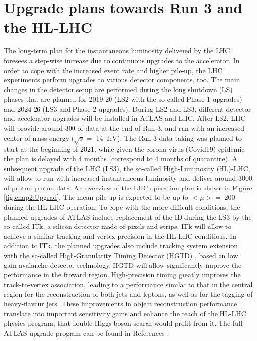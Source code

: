 \section{Upgrade plans towards Run 3 and the HL-LHC}
\label{chap2:Upgrad}
The long-term plan for the instantaneous luminosity delivered by the LHC foresees a step-wise increase due to continuous upgrades to the accelerator. In order to cope with the increased event rate and higher pile-up, the LHC experiments perform upgrades to various detector components, too. The main changes in the detector setup are performed during the long shutdown (LS) phases that are planned for 2019-20 (LS2 with the so-called Phase-1 upgrades) and 2024-26 (LS3 and Phase-2 upgrades). During LS2 and LS3, different detector and accelerator upgrades will be installed in ATLAS and LHC. After LS2, LHC will provide around 300 \ifb of data at the end of Run-3, and run with an increased center-of-mass energy ($\sqrt{s} = $ 14 TeV). The Run-3 data taking was planned to start at the beginning of 2021, while given the corona virus (Covid19) epidemic the plan is delayed with 4 months (correspond to 4 months of quarantine).  A subsequent upgrade of the LHC (LS3), the so-called High-Luminosity (HL)-LHC, will allow to run with increased instantaneous luminosity and deliver around 3000 \ifb of proton-proton data.  An overview of the LHC operation plan is shown in Figure \ref{fig:chap2:Upgrad}. The mean pile-up is expected to be up to  $<\mu> = $ 200 during the HL-LHC operation. To cope with the more difficult conditions, the planned upgrades of ATLAS include replacement of the ID during the LS3 by the so-called ITk, a silicon detector made of pixels and strips. ITk will allow to achieve a similar tracking and vertex precision in the HL-LHC conditions. In addition to ITk, the planned upgrades also include tracking system extension with the so-called High-Granularity Timing Detector (HGTD) \cite{HGTD}, based on low gain avalanche detector technology. HGTD will allow significantly improve the performance in the froward region.  High-precision timing greatly improves the track-to-vertex association, leading to a performance similar to that in the central region for the reconstruction of both jets and leptons, as well as for the tagging of heavy-flavour jets. These improvements in object reconstruction performance translate into important sensitivity gains and enhance the reach of the HL-LHC physics program, that double Higgs boson search would profit from it. The full ATLAS upgrade program can be found in References \cite{CERN-LHCC-2015-020, CERN-LHCC-2017-005, CERN-LHCC-2017-017, CERN-LHCC-2017-018, CERN-LHCC-2017-019, CERN-LHCC-2017-020, CERN-LHCC-2017-021}.


